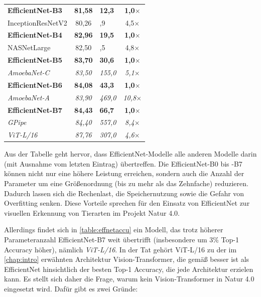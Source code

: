 \begin{table}[!ht]
\begin{tabular}{l|c|>{\centering}m{1.7cm}c}
		
		\hline
		\textbf{EfficientNet-B3} & \textbf{81,58} & \textbf{12,3 } & \textbf{1,0$\times$} \\
		InceptionResNetV2 \cite{szegedy2016inceptionv4} & 80,26 & 55,9 & 4,5$\times$\\
		
		
		\hline
		\textbf{EfficientNet-B4} & \textbf{82,96} & \textbf{19,5} & \textbf{1,0$\times$} \\
		NASNetLarge \cite{zoph2018learning} & 82,50 & 93,5 & 4,8$\times$ \\
		
		
		\hline
		\textbf{EfficientNet-B5} & \textbf{83,70} & \textbf{30,6} & \textbf{1,0$\times$} \\	
		\textit{AmoebaNet-C} \cite{cubuk2019autoaugment} & \textit{83,50} & \textit{155,0} & \textit{5,1$\times$} \\		
		
		
		\hline
		\textbf{EfficientNet-B6} & \textbf{84,08} & \textbf{43,3 } & \textbf{1,0$\times$} \\
		\textit{AmoebaNet-A} \cite{real2019regularized} & \textit{83,90} & \textit{469,0} & \textit{10,8$\times$} \\			
		
		
		\hline
		\textbf{EfficientNet-B7} & \textbf{84,43} & \textbf{66,7} & \textbf{1,0$\times$} \\
		\textit{GPipe} \cite{huang2019gpipe} & \textit{84,40} & \textit{557,0} & \textit{8,4$\times$} \\
		\textit{ViT-L/16} \cite{dosovitskiy2021image} & \textit{87,76} & \textit{307,0} & \textit{4,6$\times$} \\	
		\hline
	\end{tabular}
\end{table}

Aus der Tabelle geht hervor, dass EfficientNet-Modelle alle anderen Modelle darin (mit Ausnahme vom letzten Eintrag) übertreffen. Die EfficientNet-B0 bis -B7 können nicht nur eine höhere Leistung erreichen, sondern auch die Anzahl der Parameter um eine Größenordnung (bis zu mehr als das Zehnfache) reduzieren. Dadurch lassen sich die Rechenlast, die Speichernutzung sowie die Gefahr von Overfitting senken. Diese Vorteile sprechen für den Einsatz von EfficientNet zur visuellen Erkennung von Tierarten im Projekt Natur 4.0.

Allerdings findet sich in \autoref{table:effnetaccu} ein Modell, das trotz höherer Parameteranzahl EfficientNet-B7 weit übertrifft (insbesondere um 3\% Top-1 Accuracy höher), nämlich \emph{ViT-L/16}. In der Tat gehört ViT-L/16 zu der im \autoref{chap:intro} erwähnten Architektur Vision-Transformer, die gemäß \cite{PapersWithCode-ImageNet} besser ist als EfficientNet hinsichtlich der besten Top-1 Accuracy, die jede Architektur erzielen kann. Es stellt sich daher die Frage, warum kein Vision-Transformer in Natur 4.0 eingesetzt wird. Dafür gibt es zwei Gründe:

